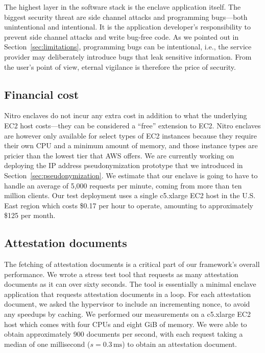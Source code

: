 The highest layer in the software stack is the enclave application itself.  The
biggest security threat are side channel attacks and programming bugs---both
unintentional and intentional.  It is the application developer's
responsibility to prevent side channel attacks and write bug-free code.  As we
pointed out in Section~\ref{sec:limitations}, programming bugs can be
intentional, i.e., the service provider may deliberately introduce bugs that
leak sensitive information.  From the user's point of view, eternal vigilance
is therefore the price of security.

\subsection{Financial cost}
\label{sec:cost}

Nitro enclaves do not incur any extra cost in addition to what the underlying
EC2 host costs---they can be considered a ``free'' extension to EC2.  Nitro
enclaves are however only available for select types of EC2 instances because
they require their own CPU and a minimum amount of memory, and those instance
types are pricier than the lowest tier that AWS offers.
%
We are currently working on deploying the IP address pseudonymization prototype
that we introduced in Section~\ref{sec:pseudonymization}.  We estimate that our
enclave is going to have to handle an average of 5,000 requests per minute,
coming from more than ten million clients.  Our test deployment uses a single
c5.xlarge EC2 host in the U.S. East region which costs \$0.17 per hour to
operate, amounting to approximately \$125 per month.

\subsection{Attestation documents}
\label{sec:attestation-performance}

The fetching of attestation documents is a critical part of our framework's
overall performance.  We wrote a stress test tool that requests as many
attestation documents as it can over sixty seconds.  The tool is essentially a
minimal enclave application that requests attestation documents in a loop.  For
each attestation document, we asked the hypervisor to include an incrementing
nonce, to avoid any speedups by caching.  We performed our measurements on a
c5.xlarge EC2 host which comes with four CPUs and eight GiB of memory.  We were
able to obtain approximately 900 documents per second, with each request taking
a median of one millisecond ($s = 0.3\,\text{ms}$) to obtain an attestation
document.

